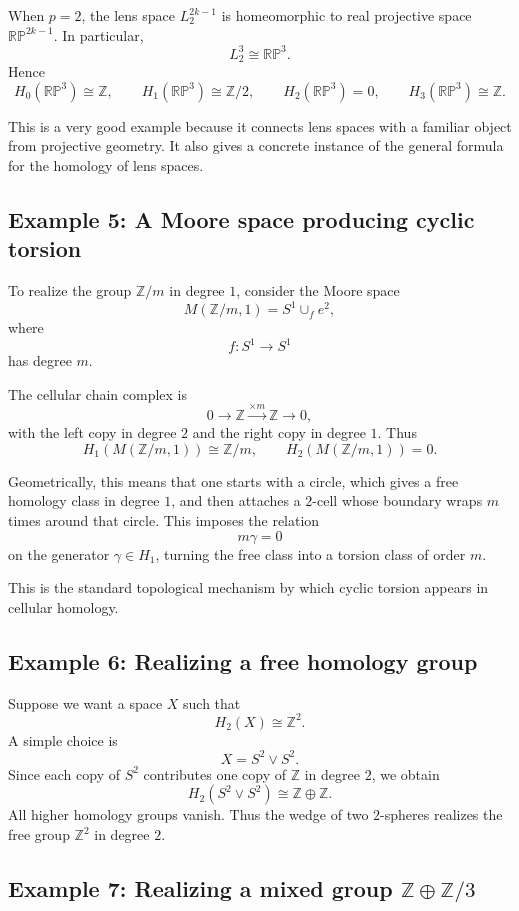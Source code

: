 \documentclass[12pt,a4paper]{article}
\theoremstyle{notespace}
\begin{document}
When \(p=2\), the lens space \(L_2^{2k-1}\) is homeomorphic to real projective space \(\mathbb{RP}^{2k-1}\). In particular,
\[
L_2^3\cong \mathbb{RP}^3.
\]
Hence
\[
H_0(\mathbb{RP}^3)\cong \mathbb Z,
\qquad
H_1(\mathbb{RP}^3)\cong \mathbb Z/2,
\qquad
H_2(\mathbb{RP}^3)=0,
\qquad
H_3(\mathbb{RP}^3)\cong \mathbb Z.
\]

This is a very good example because it connects lens spaces with a familiar object from projective geometry. It also gives a concrete instance of the general formula for the homology of lens spaces.

\subsection*{Example 5: A Moore space producing cyclic torsion}

To realize the group \(\mathbb Z/m\) in degree \(1\), consider the Moore space
\[
M(\mathbb Z/m,1)=S^1\cup_f e^2,
\]
where
\[
f:S^1\to S^1
\]
has degree \(m\).

The cellular chain complex is
\[
0\longrightarrow \mathbb Z \xrightarrow{\times m} \mathbb Z \longrightarrow 0,
\]
with the left copy in degree \(2\) and the right copy in degree \(1\). Thus
\[
H_1(M(\mathbb Z/m,1))\cong \mathbb Z/m,
\qquad
H_2(M(\mathbb Z/m,1))=0.
\]

Geometrically, this means that one starts with a circle, which gives a free homology class in degree \(1\), and then attaches a \(2\)-cell whose boundary wraps \(m\) times around that circle. This imposes the relation
\[
m\gamma=0
\]
on the generator \(\gamma\in H_1\), turning the free class into a torsion class of order \(m\).

This is the standard topological mechanism by which cyclic torsion appears in cellular homology.

\subsection*{Example 6: Realizing a free homology group}

Suppose we want a space \(X\) such that
\[
H_2(X)\cong \mathbb Z^2.
\]
A simple choice is
\[
X=S^2\vee S^2.
\]
Since each copy of \(S^2\) contributes one copy of \(\mathbb Z\) in degree \(2\), we obtain
\[
H_2(S^2\vee S^2)\cong \mathbb Z\oplus \mathbb Z.
\]
All higher homology groups vanish. Thus the wedge of two \(2\)-spheres realizes the free group \(\mathbb Z^2\) in degree \(2\).

\subsection*{Example 7: Realizing a mixed group \texorpdfstring{$\mathbb Z\oplus \mathbb Z/3$}{Z plus Z/3}}
\end{document}
